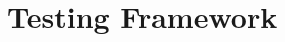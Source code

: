 \documentclass{stdlocal}
\begin{document}
\section{Testing Framework} %
\label{sec:testing_framework}

\end{document}
